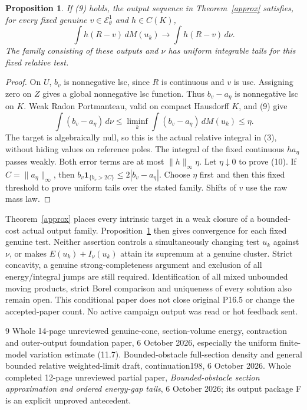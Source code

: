 \documentclass[11pt]{article}
\newtheorem{proposition}[theorem]{Proposition}
\newcommand{\EE}{\mathcal E^1_\theta}
\begin{document}
\begin{proposition}\label{integration}
If (9) holds, the output sequence in Theorem~\ref{approx} satisfies,
for every fixed genuine $v\in\EE$ and $h\in C(K)$,
\[
 \int h(R-v)\,dM(u_k)\longrightarrow\int h(R-v)\,d\nu.     \tag{10}
\]
The family consisting of these outputs and $\nu$ has uniform
integrable tails for this fixed relative test.
\end{proposition}
\begin{proof}
On $U$, $b_v$ is nonnegative lsc, since $R$ is continuous and $v$
is usc. Assigning zero on $Z$ gives a global nonnegative lsc
function. Thus $b_v-a_\eta$ is nonnegative lsc on $K$.
Weak Radon Portmanteau, valid on compact Hausdorff $K$, and (9) give
\[
 \int(b_v-a_\eta)\,d\nu
       \leq\liminf_k\int(b_v-a_\eta)\,dM(u_k)\leq\eta.
\]
The target is algebraically null, so this is the actual relative
integral in (3), without hiding values on reference poles.
The integral of the fixed continuous $h a_\eta$ passes weakly.
Both error terms are at most $\|h\|_\infty\eta$.
Let $\eta\downarrow0$ to prove (10).
If $C=\|a_\eta\|_\infty$, then
$b_v\mathbf1_{\{b_v>2C\}}\leq2|b_v-a_\eta|$.
Choose $\eta$ first and then this fixed threshold to prove uniform
tails over the stated family. Shifts of $v$ use the raw mass law.
\end{proof}

Theorem~\ref{approx} places every intrinsic target in a weak closure
of a bounded-cost actual output family. Proposition~\ref{integration}
then gives convergence for each fixed genuine test. Neither assertion
controls a simultaneously changing test $u_k$ against $\nu$, or makes
$E(u_k)+I_\nu(u_k)$ attain its supremum at a genuine cluster.
Strict concavity, a genuine strong-completeness argument and exclusion
of all energy/integral jumps are still required. Identification of
all mixed unbounded moving products, strict Borel comparison and
uniqueness of every solution also remain open.
This conditional paper does not close original P16.5 or change the
accepted-paper count. No active campaign output was read or hot
feedback sent.

\begin{thebibliography}{9}\small
{} Whole 14-page unreviewed genuine-cone, section-volume
energy, contraction and outer-output foundation paper, 6 October 2026,
especially the uniform finite-model variation estimate (11.7).
 Bounded-obstacle full-section density and general
bounded relative weighted-limit draft, continuation198, 6 October 2026.
 Whole completed 12-page unreviewed partial paper,
\emph{Bounded-obstacle section approximation and ordered energy-gap tails},
6 October 2026; its output package F is an explicit unproved antecedent.
\end{thebibliography}
\end{document}
